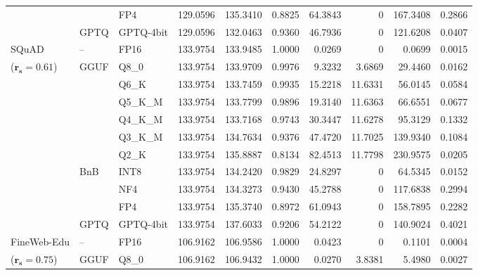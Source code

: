 \begin{longtable}{ll l rrrrrrr}
 &  & FP4 & 129.0596 & 135.3410 & \cellcolor{red!18} 0.8825 & \cellcolor{red!18} 64.3843 & \cellcolor{cyan!12} $0$ & \cellcolor{red!18} 167.3408 & \cellcolor{red!18} 0.2866 \\
 & GPTQ & GPTQ-4bit & 129.0596 & 132.0463 & \cellcolor{red!18} 0.9360 & \cellcolor{red!18} 46.7936 & \cellcolor{cyan!12} $0$ & \cellcolor{red!18} 121.6208 & \cellcolor{red!18} 0.0407 \\
\midrule
SQuAD & -- & FP16 & 133.9754 & 133.9485 & 1.0000 & 0.0269 & \cellcolor{cyan!12} $0$ & 0.0699 & 0.0015 \\
{\small ($\mathbf{r_s{=}0.61}$)} & GGUF & Q8\_0 & 133.9754 & 133.9709 & 0.9976 & 9.3232 & 3.6869 & 29.4460 & 0.0162 \\
 &  & Q6\_K & 133.9754 & 133.7459 & 0.9935 & 15.2218 & 11.6331 & 56.0145 & 0.0584 \\
 &  & Q5\_K\_M & 133.9754 & 133.7799 & 0.9896 & 19.3140 & 11.6363 & 66.6551 & 0.0677 \\
 &  & Q4\_K\_M & 133.9754 & 133.7168 & 0.9743 & 30.3447 & 11.6278 & 95.3129 & 0.1332 \\
 &  & Q3\_K\_M & 133.9754 & 134.7634 & \cellcolor{red!18} 0.9376 & \cellcolor{red!18} 47.4720 & 11.7025 & \cellcolor{red!18} 139.9340 & \cellcolor{red!18} 0.1084 \\
 &  & Q2\_K & 133.9754 & 135.8887 & \cellcolor{red!18} 0.8134 & \cellcolor{red!18} 82.4513 & 11.7798 & \cellcolor{red!18} 230.9575 & \cellcolor{red!18} 0.0205 \\
 & BnB & INT8 & 133.9754 & 134.2420 & 0.9829 & 24.8297 & \cellcolor{cyan!12} $0$ & 64.5345 & 0.0152 \\
 &  & NF4 & 133.9754 & 134.3273 & \cellcolor{red!18} 0.9430 & \cellcolor{red!18} 45.2788 & \cellcolor{cyan!12} $0$ & \cellcolor{red!18} 117.6838 & \cellcolor{red!18} 0.2994 \\
 &  & FP4 & 133.9754 & 135.3740 & \cellcolor{red!18} 0.8972 & \cellcolor{red!18} 61.0943 & \cellcolor{cyan!12} $0$ & \cellcolor{red!18} 158.7895 & \cellcolor{red!18} 0.2282 \\
 & GPTQ & GPTQ-4bit & 133.9754 & 137.6033 & \cellcolor{red!18} 0.9206 & \cellcolor{red!18} 54.2122 & \cellcolor{cyan!12} $0$ & \cellcolor{red!18} 140.9024 & \cellcolor{red!18} 0.4021 \\
\midrule
FineWeb-Edu & -- & FP16 & 106.9162 & 106.9586 & 1.0000 & 0.0423 & \cellcolor{cyan!12} $0$ & 0.1101 & 0.0004 \\
{\small ($\mathbf{r_s{=}0.75}$)} & GGUF & Q8\_0 & 106.9162 & 106.9432 & 1.0000 & 0.0270 & 3.8381 & 5.4980 & 0.0027 \\

\end{longtable}
